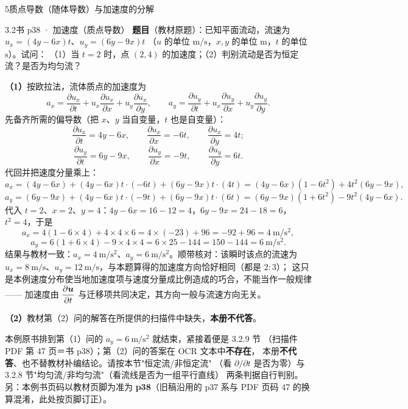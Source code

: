 \begin{kaodian}{5}{质点导数（随体导数）与加速度的分解}
\begin{liti}{3.2}{书 p38 · 加速度（质点导数）}
\textbf{题目}（教材原题）：已知平面流动，流速为 $u_x=(4y-6x)t$、$u_y=(6y-9x)t$
（$u$ 的单位 $\mathrm{m/s}$，$x,y$ 的单位 $\mathrm{m}$，$t$ 的单位 $\mathrm{s}$）。试问：
（1）当 $t=2$ 时，点 $(2,4)$ 的加速度；（2）判别流动是否为恒定流？是否为均匀流？

\begin{jie}
\textbf{（1）}按欧拉法，流体质点的加速度为
\[
a_x=\frac{\partial u_x}{\partial t}+u_x\frac{\partial u_x}{\partial x}+u_y\frac{\partial u_x}{\partial y},
\qquad
a_y=\frac{\partial u_y}{\partial t}+u_x\frac{\partial u_y}{\partial x}+u_y\frac{\partial u_y}{\partial y}.
\]
先备齐所需的偏导数（把 $x$、$y$ 当自变量，$t$ 也是自变量）：
\[
\frac{\partial u_x}{\partial t}=4y-6x,\qquad
\frac{\partial u_x}{\partial x}=-6t,\qquad
\frac{\partial u_x}{\partial y}=4t;
\]
\[
\frac{\partial u_y}{\partial t}=6y-9x,\qquad
\frac{\partial u_y}{\partial x}=-9t,\qquad
\frac{\partial u_y}{\partial y}=6t .
\]
代回并把速度分量乘上：
\[
a_x=(4y-6x)+(4y-6x)t\cdot(-6t)+(6y-9x)t\cdot(4t)
=(4y-6x)(1-6t^2)+4t^2(6y-9x),
\]
\[
a_y=(6y-9x)+(4y-6x)t\cdot(-9t)+(6y-9x)t\cdot(6t)
=(6y-9x)(1+6t^2)-9t^2(4y-6x).
\]
代入 $t=2$、$x=2$、$y=4$：$4y-6x=16-12=4$，$6y-9x=24-18=6$，$t^2=4$，于是
\[
a_x=4(1-6\times4)+4\times4\times6=4\times(-23)+96=-92+96=4\ \mathrm{m/s^2},
\]
\[
a_y=6(1+6\times4)-9\times4\times4=6\times25-144=150-144=6\ \mathrm{m/s^2}.
\]
结果与教材一致：$a_x=4\ \mathrm{m/s^2}$、$a_y=6\ \mathrm{m/s^2}$。顺带核对：该瞬时该点的流速为
$u_x=8\ \mathrm{m/s}$、$u_y=12\ \mathrm{m/s}$，与本题算得的加速度方向恰好相同（都是 $2:3$）；
这只是本例速度分布使当地加速度项与速度分量成比例造成的巧合，不能当作一般规律——
加速度由 $\dfrac{\partial\bm{u}}{\partial t}$ 与迁移项共同决定，其方向一般与流速方向无关。

\textbf{（2）}教材第（2）问的解答在所提供的扫描件中缺失，\textbf{本册不代答}。

\begin{tishi}
本例原书排到第（1）问的 $a_y=6\ \mathrm{m/s^2}$ 就结束，紧接着便是 3.2.9 节
（扫描件 PDF 第 47 页＝书 p38）；第（2）问的答案在 OCR 文本中\textbf{不存在}，
本册\textbf{不代答}、也不替教材补编结论。请按本节"恒定流/非恒定流"
（看 $\partial/\partial t$ 是否为零）与 3.2.8 节"均匀流/非均匀流"（看流线是否为一组平行直线）
两条判据自行判别。\\
另：本例书页码以教材页脚为准为 \textbf{p38}（旧稿沿用的 p37 系与 PDF 页码 47 的换算混淆，此处按页脚订正）。
\end{tishi}
\end{jie}
\end{liti}


\end{kaodian}
